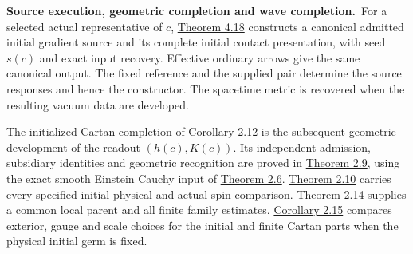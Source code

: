 \documentclass[
  english,
  11pt,
  reqno]{amsart}
\makeatletter
\newcommand{\paperleadspace}{%
  \par\if@nobreak\else
    \addpenalty{\@secpenalty}\addvspace{.5\baselineskip}%
  \fi}
\newcommand{\paperleadin}[1]{%
  \ifvmode\paperleadspace\fi
  \textbf{#1}}
\makeatother
\begin{document}
\paperleadin{Source execution, geometric completion and wave completion.}~For
a selected actual representative of \(c\),
\hyperref[thm:online-ordinary-negative-response-initial-source]{Theorem
4.18} constructs a canonical admitted initial gradient source and its
complete initial contact presentation, with seed \(s(c)\) and exact
input recovery. Effective ordinary arrows give the same canonical
output. The fixed reference and the supplied pair determine the source
responses and hence the constructor. The spacetime metric is recovered
when the resulting vacuum data are developed.

The initialized Cartan completion of
\hyperref[cor:online-ordinary-pair-cartan-collar]{Corollary 2.12} is the
subsequent geometric development of the readout \((h(c),K(c))\). Its
independent admission, subsidiary identities and geometric recognition
are proved in \hyperref[thm:online-cartan-collar-recognition]{Theorem
2.9}, using the exact smooth Einstein Cauchy input of
\hyperref[thm:online-smooth-local-cauchy-input]{Theorem 2.6}.
\hyperref[thm:online-marked-collar-full-hom]{Theorem 2.10} carries every
specified initial physical and actual spin comparison.
\hyperref[thm:online-common-collar-finite-families]{Theorem 2.14}
supplies a common local parent and all finite family estimates.
\hyperref[cor:online-fixed-slice-geometric-choice-independence]{Corollary
2.15} compares exterior, gauge and scale choices for the initial and
finite Cartan parts when the physical initial germ is fixed.
\end{document}
